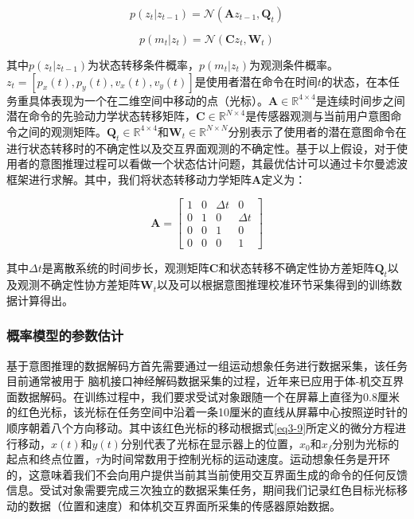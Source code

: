\begin{equation}
\label{eq7}
p({z_t}|{z_{t - 1}}) = \mathcal{N}({\mathbf{A}}{z_{t - 1}},{{\mathbf{Q}}_t})
\end{equation}   

\begin{equation}
\label{eq8}
p({m_t}|{z_t}) = \mathcal{N}({\mathbf{C}}{z_t},{{\mathbf{W}}_t})
\end{equation}    

其中$p({z_t}|{z_{t - 1}})$为状态转移条件概率，$p({m_t}|{z_t})$为观测条件概率。${z_t} = [{p_x}(t),{p_y}(t),{v_x}(t),{v_y}(t)]$是使用者潜在命令在时间$t$的状态，在本任务重具体表现为一个在二维空间中移动的点（光标）。${\mathbf{A}} \in {\mathbb{R}^{4 \times 4}}$是连续时间步之间潜在命令的先验动力学状态转移矩阵，${\mathbf{C}} \in {\mathbb{R}^{N \times 4}}$是传感器观测与当前用户意图命令之间的观测矩阵。${{\mathbf{Q}}_t} \in {\mathbb{R}^{4 \times 4}}$和${{\mathbf{W}}_t} \in {\mathbb{R}^{N \times N}}$分别表示了使用者的潜在意图命令在进行状态转移时的不确定性以及交互界面观测的不确定性。基于以上假设，对于使用者的意图推理过程可以看做一个状态估计问题，其最优估计可以通过卡尔曼滤波框架进行求解。其中，我们将状态转移动力学矩阵${\mathbf{A}}$定义为：

\begin{equation}
\mathbf{A} = 
\begin{bmatrix}{}
1&0&{\Delta t}&0  \\  
0&1&0&{\Delta t}  \\  
0&0&1&0  \\  
0&0&0&1 
\end{bmatrix}
\end{equation} 

其中$\Delta t$是离散系统的时间步长，观测矩阵${\boldsymbol{C}}$和状态转移不确定性协方差矩阵${{\boldsymbol{Q}}_t}$以及观测不确定性协方差矩阵${{\boldsymbol{W}}_t}$以及可以根据意图推理校准环节采集得到的训练数据计算得出。


\subsubsection{概率模型的参数估计}基于意图推理的数据解码方首先需要通过一组运动想象任务进行数据采集，该任务目前通常被用于 脑机接口神经解码数据采集的过程\cite{malikEfficientDecodingSteadyState2011,brandmanRapidCalibrationIntracortical2018}，近年来已应用于体-机交互界面数据解码\cite{seanez-gonzalezCursorControlKalman2014a,seanez-gonzalezStaticDynamicDecoding2017}。在训练过程中，我们要求受试对象跟随一个在屏幕上直径为0.8厘米的红色光标，该光标在任务空间中沿着一条10厘米的直线从屏幕中心按照逆时针的顺序朝着八个方向移动。其中该红色光标的移动根据式\ref{eq3-9}所定义的微分方程进行移动\cite{seanez-gonzalezStaticDynamicDecoding2017}，$x(t)$和$y(t)$分别代表了光标在显示器上的位置，$x_0$和$x_f$分别为光标的起点和终点位置，$\tau$为时间常数用于控制光标的运动速度。运动想象任务是开环的，这意味着我们不会向用户提供当前其当前使用交互界面生成的命令的任何反馈信息。受试对象需要完成三次独立的数据采集任务，期间我们记录红色目标光标移动的数据（位置和速度）和体机交互界面所采集的传感器原始数据。

